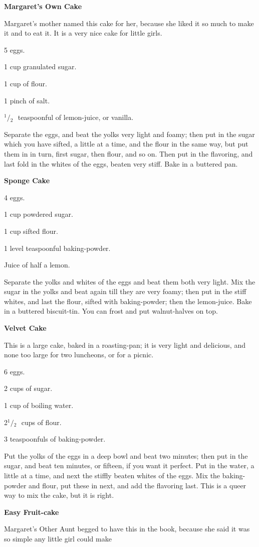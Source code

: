 \documentclass[11pt]{book}
\newcommand{\indpar}{\par\noindent\hspace*{\parindent}}
\newcommand{\ingredient}{\indpar}
\newcommand{\instruction}{\indpar}
\newcommand{\OneHalf}{\ensuremath{{}^1\!\!/\!{}_2\mbox{\ }}}
\newenvironment{RecipeTitle}{\medskip\begin{center}\large\bf }{\end{center}\smallskip}
\begin{document}
\begin{RecipeTitle}
Margaret's Own Cake\label{margarets_own_cake}
\end{RecipeTitle}
\instruction  Margaret's mother named this cake for her, because she liked
it so much to make it and to eat it.  It is a very nice cake
for little girls.
\ingredient  5 eggs.
\ingredient  1 cup granulated sugar.
\ingredient  1 cup of flour.
\ingredient  1 pinch of salt.
\ingredient  \OneHalf teaspoonful of lemon-juice, or vanilla.
\instruction  Separate the eggs, and beat the yolks very light and foamy;
then put in the sugar which you have sifted, a little at a
time, and the flour in the same way, but put them in in turn,
first sugar, then flour, and so on.  Then put in the
flavoring, and last fold in the whites of the eggs, beaten
very stiff.  Bake in a buttered pan.
\begin{RecipeTitle}
Sponge Cake\label{sponge_cake}
\end{RecipeTitle}
\ingredient  4 eggs.
\ingredient  1 cup powdered sugar.
\ingredient  1 cup sifted flour.
\ingredient  1 level teaspoonful baking-powder.
\ingredient  Juice of half a lemon.
\instruction  Separate the yolks and whites of the eggs and beat them both
very light.  Mix the sugar in the yolks and beat again till
they are very foamy; then put in the stiff whites, and last
the flour, sifted with baking-powder; then the lemon-juice.
Bake in a buttered biscuit-tin.  You can frost and put
walnut-halves on top.
\begin{RecipeTitle}
Velvet Cake\label{velvet_cake}
\end{RecipeTitle}
\instruction  This is a large cake, baked in a roasting-pan; it is very
light and delicious, and none too large for two luncheons, or
for a picnic.
\ingredient  6 eggs.
\ingredient  2 cups of sugar.
\ingredient  1 cup of boiling water.
\ingredient  2\OneHalf cups of flour.
\ingredient  3 teaspoonfuls of baking-powder.
\instruction  Put the yolks of the eggs in a deep bowl and beat two
minutes; then put in the sugar, and beat ten minutes, or
fifteen, if you want it perfect.  Put in the water, a little
at a time, and next the stiffly beaten whites of the eggs.
Mix the baking-powder and flour, put these in next, and add
the flavoring last.  This is a queer way to mix the cake, but
it is right.
\begin{RecipeTitle}
Easy Fruit-cake\label{easy_fruit_cake}
\end{RecipeTitle}
\indpar  Margaret's Other Aunt begged to have this in the book,
because she said it was so simple any little girl could make
\end{document}
